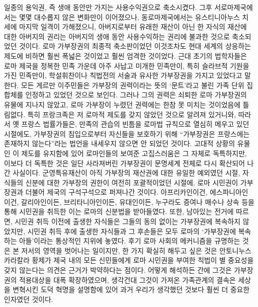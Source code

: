 일종의 용익권,
즉 생애 동안만 가지는 사용수익권으로 축소시켰다.
그후 서로마제국에서는 몇몇 대수롭지 않은 변화만이 이어졌으나,
동로마제국에서는 유스티니아누스 치세에 마지막 일격이 가해졌으니,
아버지로부터 유래한 재산이 아닌 한
자식의 재산에 대한 아버지의 권리는
아버지의 생애 동안 사용수익하는 권리에 불과한 것으로 축소되었던 것이다.
로마 가부장권의 최종적 축소판이었던 이것조차도
현대 세계의 상응하는 제도에 비하면 훨씬 폭넓은 것이었고
훨씬 엄격한 것이었다.
근대 초기의 법학자들은 로마 제국을 정복한 민족 가운데
아주 사납고 미개한 민족만이, 특히 슬라브적 기원을 가진 민족만이,
학설휘찬이나 칙법전의 서술과 유사한
가부장권을 가지고 있었다고 말한다.
모든 게르만 이주민들은 가부장의 권력이라는 뜻의 `문트'라고 불린
가족 단위 집합체를 인정하고 있었던 것으로 보인다.
그러나 그의 권력은 쇠퇴한 로마 가부장권의 유물에 지나지 않았고,
로마 가부장이 누렸던 권력에는 한참 못 미치는 것이었음에 틀림없다.
특히 프랑크족은 저 로마적 제도를 갖지 않았던 것으로 알려져 있거니와,
따라서 옛 프랑스 법률가들은,
만족의 관습의 빈틈을 로마법 규칙으로 열심히 메우고 있던 시절에도,
가부장권의 침입으로부터 자신들을 보호하기 위해
``가부장권은 프랑스에는 존재하지 않는다''라는 법언을 내세우지 않으면 안 되었던 것이다.
고대적 상황의 유물인 이 제도를 유지함에 있어 로마인들의 보여준 고집스러움은
그 자체로 독특하지만, 이보다 더 독특한 것은
일단 사라져버린 가부장권이 문명세계 전체로 다시 확산되어 나간 사실이다.
군영특유재산이 아직 가부장의 재산권에 대한 유일한 예외였던 시절,
자식들의 신분에 대한 가부장의 권한이 여전히 포괄적이었던 시절에,
로마 시민권이 가부장권과 더불어 제국의 구석구석으로 퍼져나간 것이다.
아프리카인이건, 에스파니아인이건, 갈리아인이든, 브리타니아인이든, 유대인이든,
누구라도 증여나 매수나 상속 등을 통해 시민권을 취득한 이는
로마의 신분법을 받아들였다.
또한, 남아있는 전거에 따르면, 시민권 취득 이전에 출생한 자식들은
그들의 동의 없이는 가부장권에 복속하지 않았지만,
시민권 취득 후에 출생한 자식들과 그 후손들은 모두 로마의
`가부장권에 복속하는 아들'이라는 통상적인 지위에 놓였다.
후기 로마 사회의 메커니즘을 규명하는 것은 본 저서의 영역을 벗어나는 일이지만,
한 가지 확실히 해두고 싶은 것은
안토니누스 카라칼라 황제가 제국 내의 모든 신민들에게 로마 시민권을 부여한
칙법이 별 중요성을 갖지 않는다는 의견은 근거가 박약하다는 점이다.
어떻게 해석하든 간에
그것은 가부장권의 적용대상을 대폭 확장하였으며,
생각건대 그것이 가져온 가족관계의 결속은
세상을 변혁시킨 도덕 혁명을 설명함에 있어
과거 우리가 생각했던 것보다 훨씬 더 중요한 인자였던 것이다.

